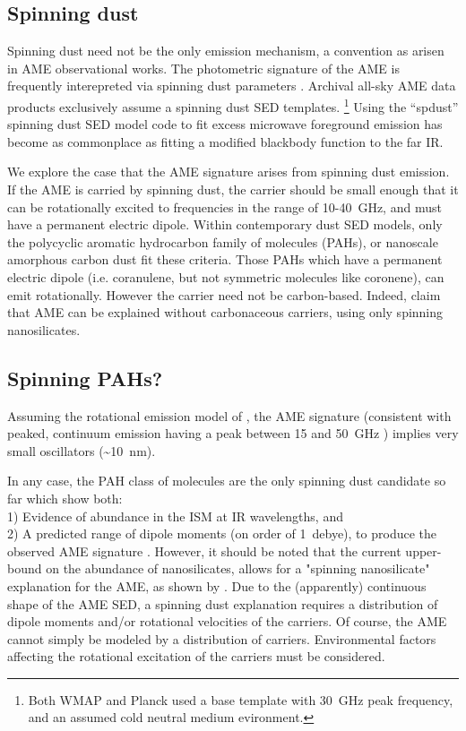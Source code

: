     \subsection{Spinning dust}
     Spinning dust need not be the only emission mechanism, a convention as arisen in AME observational works. The photometric signature of the AME is frequently interepreted via spinning dust parameters \citep{ysard11,ali-haimoud10}. Archival all-sky AME data products exclusively assume a spinning dust SED templates.   \footnote{Both WMAP and Planck used a base template with 30~GHz peak frequency, and an assumed cold neutral medium evironment.} Using the ``spdust'' spinning dust SED model code to fit excess microwave foreground emission has become as commonplace as fitting a modified blackbody function to the far IR.

      We explore the case that the AME signature arises from spinning dust emission. If the AME is carried by spinning dust, the carrier should be small enough that it can be rotationally excited to frequencies in the range of 10-40~GHz, and must have a permanent electric dipole. Within contemporary dust SED models, only the polycyclic aromatic hydrocarbon family of molecules (PAHs), or nanoscale amorphous carbon dust fit these criteria. Those PAHs which have a permanent electric dipole (i.e. coranulene, but not symmetric molecules like coronene), can emit rotationally. However the carrier need not be carbon-based. Indeed, \cite{hensley17a} claim that AME can be explained without carbonaceous carriers, using only spinning nanosilicates.

     \subsection{Spinning PAHs?}
       Assuming the rotational emission model of \cite{draine98b}, the AME signature (consistent with peaked, continuum emission having a peak between 15 and 50~GHz ) implies very small oscillators (\textasciitilde{}10~nm).

       In any case, the PAH class of molecules are the only spinning dust candidate so far which show both: \\
       1) Evidence of abundance in the ISM at IR wavelengths, and \\
       2) A predicted range of dipole moments (on order of 1~debye), to produce the observed AME signature \citep{draine98b, lovas05, thorwirth07}. However, it should be noted that the current upper-bound on the abundance of nanosilicates, allows for a "spinning nanosilicate" explanation for the AME, as shown by \cite{hensley17a}. Due to the (apparently) continuous shape of the AME SED, a spinning dust explanation requires a distribution of dipole moments and/or rotational velocities of the carriers. Of course, the AME cannot simply be modeled by a distribution of carriers. Environmental factors affecting the rotational excitation of the carriers must be considered.

